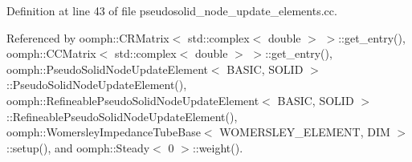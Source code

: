 Definition at line 43 of file pseudosolid\+\_\+node\+\_\+update\+\_\+elements.\+cc.



Referenced by oomph\+::\+C\+R\+Matrix$<$ std\+::complex$<$ double $>$ $>$\+::get\+\_\+entry(), oomph\+::\+C\+C\+Matrix$<$ std\+::complex$<$ double $>$ $>$\+::get\+\_\+entry(), oomph\+::\+Pseudo\+Solid\+Node\+Update\+Element$<$ B\+A\+S\+I\+C, S\+O\+L\+I\+D $>$\+::\+Pseudo\+Solid\+Node\+Update\+Element(), oomph\+::\+Refineable\+Pseudo\+Solid\+Node\+Update\+Element$<$ B\+A\+S\+I\+C, S\+O\+L\+I\+D $>$\+::\+Refineable\+Pseudo\+Solid\+Node\+Update\+Element(), oomph\+::\+Womersley\+Impedance\+Tube\+Base$<$ W\+O\+M\+E\+R\+S\+L\+E\+Y\+\_\+\+E\+L\+E\+M\+E\+N\+T, D\+I\+M $>$\+::setup(), and oomph\+::\+Steady$<$ 0 $>$\+::weight().


